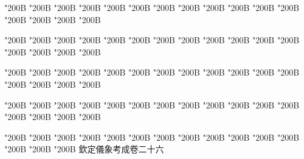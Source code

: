 \begin{正文}
\char"200B\relax{}
\char"200B\relax{}
\char"200B\relax{}
\char"200B\relax{}
\char"200B\relax{}
\char"200B\relax{}
\char"200B\relax{}
\char"200B\relax{}
\char"200B\relax{}
\char"200B\relax{}
\char"200B\relax{}
\char"200B\relax{}
\char"200B\relax{}
\char"200B\relax{}
\char"200B\relax{}
\char"200B\relax
{}\par
\end{正文}\clearpage
{}
\begin{正文}
\char"200B\relax{}
\char"200B\relax{}
\char"200B\relax{}
\char"200B\relax{}
\char"200B\relax{}
\char"200B\relax{}
\char"200B\relax{}
\char"200B\relax{}
\char"200B\relax{}
\char"200B\relax{}
\char"200B\relax{}
\char"200B\relax{}
\char"200B\relax{}
\char"200B\relax{}
\char"200B\relax{}
\char"200B\relax
{}\par
\end{正文}\clearpage
{}
\begin{正文}
\char"200B\relax{}
\char"200B\relax{}
\char"200B\relax{}
\char"200B\relax{}
\char"200B\relax{}
\char"200B\relax{}
\char"200B\relax{}
\char"200B\relax{}
\char"200B\relax{}
\char"200B\relax{}
\char"200B\relax{}
\char"200B\relax{}
\char"200B\relax{}
\char"200B\relax{}
\char"200B\relax{}
\char"200B\relax
{}\par
\end{正文}\clearpage
{}
\begin{正文}
\char"200B\relax{}
\char"200B\relax{}
\char"200B\relax{}
\char"200B\relax{}
\char"200B\relax{}
\char"200B\relax{}
\char"200B\relax{}
\char"200B\relax{}
\char"200B\relax{}
\char"200B\relax{}
\char"200B\relax{}
\char"200B\relax{}
\char"200B\relax{}
\char"200B\relax{}
\char"200B\relax{}
\char"200B\relax
{}\par
\end{正文}\clearpage
{}
\begin{正文}
\char"200B\relax{}
\char"200B\relax{}
\char"200B\relax{}
\char"200B\relax{}
\char"200B\relax{}
\char"200B\relax{}
\char"200B\relax{}
\char"200B\relax{}
\char"200B\relax{}
\char"200B\relax{}
\char"200B\relax{}
\char"200B\relax{}
\char"200B\relax{}
\char"200B\relax{}
\char"200B\relax{}
欽定儀象考成卷二十六
\par

\par\end{正文}\clearpage
